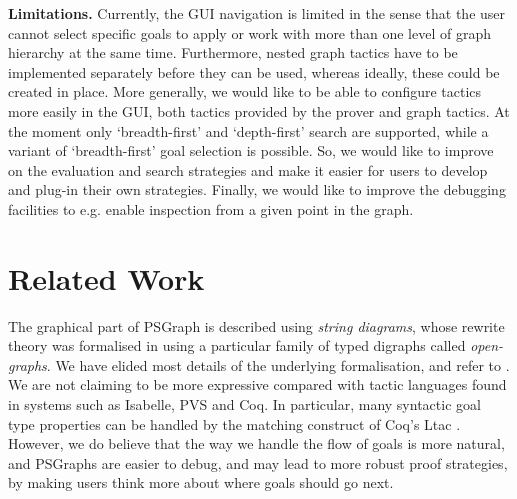 \documentclass{llncs}
\begin{document}
\vspace{10pt}
\noindent \textbf{Limitations.} 
Currently, the GUI navigation is limited in the sense that the user cannot select specific goals to apply or work with
more than one level of graph hierarchy at the same time. Furthermore, nested graph tactics have to be implemented
separately before they can be used, whereas ideally, these could be created in place. More generally, we would like to
be able to configure tactics more easily in the GUI, both tactics provided by the prover and graph tactics. At the
moment only `breadth-first' and `depth-first' search are supported, while a variant of `breadth-first' goal selection is
possible. So, we would like to improve on the evaluation and search strategies and make it easier for users to develop
and plug-in their own strategies. Finally, we would like to improve the debugging facilities to e.g. enable inspection
from a given point in the graph.


\beforesection
\section{Related Work} \label{sec:related}
\aftersection

The graphical part of PSGraph is described using \emph{string diagrams}, whose rewrite theory was formalised in \cite{paper:Dixon:10}
using a particular family of typed digraphs called \textit{open-graphs}. We have elided most details of the underlying formalisation, and refer to \cite{paper:Dixon:10}. We are not claiming to be more expressive compared with tactic languages found in systems such as Isabelle, PVS and Coq. In particular, many syntactic 
goal type properties can be handled by the matching construct of Coq's {\cal L}tac \cite{Delahaye02}. However, we do believe that the way we handle the flow of goals is more natural, and PSGraphs are easier to debug, and may lead to more robust proof strategies, by making users think more about where goals should go next.
\end{document}
